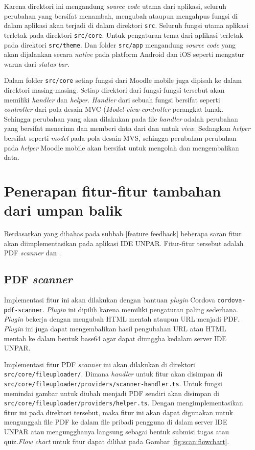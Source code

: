 Karena direktori ini mengandung \textit{source code} utama dari aplikasi, seluruh perubahan yang bersifat menambah, mengubah ataupun mengahpus fungsi di dalam aplikasi akan terjadi di dalam direktori \texttt{src}. Seluruh fungsi utama aplikasi terletak pada direktori \texttt{src/core}. Untuk pengaturan tema dari aplikasi terletak pada direktori \texttt{src/theme}. Dan folder \texttt{src/app} mengandung \textit{source code} yang akan dijalankan secara \textit{native} pada platform Android dan iOS seperti mengatur warna dari \textit{status bar}.	

Dalam folder \texttt{src/core} setiap fungsi dari Moodle mobile juga dipisah ke dalam direktori masing-masing. Setiap direktori dari fungsi-fungsi tersebut akan memiliki \textit{handler} dan \textit{helper}. \textit{Handler} dari sebuah fungsi bersifat seperti \textit{controller} dari pola desain MVC (\textit{Model-view-controller} perangkat lunak. Sehingga perubahan yang akan dilakukan pada file \textit{handler} adalah perubahan yang bersifat menerima dan memberi data dari dan untuk \textit{view}. Sedangkan \textit{helper} bersifat seperti \textit{model} pada pola desain MVS, sehingga perubahan-perubahan pada \textit{helper} Moodle mobile akan bersifat untuk mengolah dan mengembalikan data.

\section{Penerapan fitur-fitur tambahan dari umpan balik}

Berdasarkan yang dibahas pada subbab \ref{feature feedback} beberapa saran fitur akan diimplementasikan pada aplikasi IDE UNPAR. Fitur-fitur tersebut adalah PDF \textit{scanner} dan .

\subsection{PDF \textit{scanner}}
Implementasi fitur ini akan dilakukan dengan bantuan \textit{plugin} Cordova \texttt{cordova-pdf-scanner}. \textit{Plugin} ini dipilih karena memiliki pengaturan paling sederhana. \textit{Plugin} bekerja dengan mengubah HTML mentah ataupun URL menjadi PDF. \textit{Plugin} ini juga dapat mengembalikan hasil pengubahan URL atau HTML mentah ke dalam bentuk base64 agar dapat diunggha kedalam server IDE UNPAR. 

Implementasi fitur PDF \textit{scanner} ini akan dilakukan di direktori \texttt{src/core/fileuploader/}. Dimana \textit{handler} untuk fitur akan disimpan di \texttt{src/core/fileuploader/providers/scanner-handler.ts}. Untuk fungsi memindai gambar untuk diubah menjadi PDF sendiri akan disimpan di \\ \texttt{src/core/fileuploader/providers/helper.ts}. Dengan mengimplementasikan fitur ini pada direktori tersebut, maka fitur ini akan dapat digunakan untuk mengunggah file PDF ke dalam file pribadi pengguna di dalam server IDE UNPAR atau mengungghanya langsung sebagai bentuk submisi tugas atau quiz.\textit{Flow chart} untuk fitur dapat dilihat pada Gambar \ref{fig:scan:flowchart}. 

